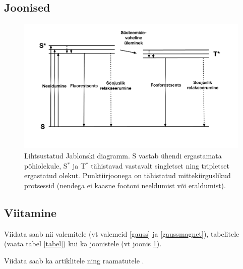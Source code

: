 \subsection{Joonised}

\begin{figure}[H]
    \centering
    \includegraphics[width=\textwidth]{figures/jablonski.pdf}
    \caption{\label{jablonski}Lihtsustatud Jablonski diagramm. S vastab ühendi ergastamata põhiolekule, S$^*$ ja T$^*$ tähistavad vastavalt singletset ning tripletset ergastatud olekut. Punktiirjoonega on tähistatud mittekiirguslikud protsessid (nendega ei kaasne footoni neeldumist või eraldumist).}
\end{figure}

\subsection{Viitamine}

Viidata saab nii valemitele (vt valemeid \ref{gauss} ja \ref{gaussmagnet}), tabelitele (vaata tabel \ref{tabel}) kui ka joonistele (vt joonis \ref{jablonski}).

Viidata saab ka artiklitele \cite{iupac} ning raamatutele \cite{Atkins2005, Lakowicz2006}.